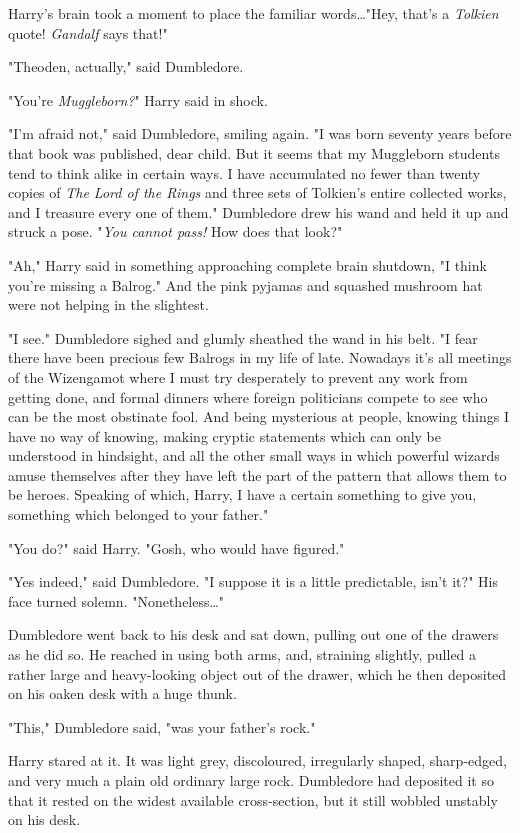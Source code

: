 Harry’s brain took a moment to place the familiar words…"Hey, that’s a
\emph{Tolkien} quote! \emph{Gandalf} says that!"

"Theoden, actually," said Dumbledore.

"You’re \emph{Muggleborn?}" Harry said in shock.

"I’m afraid not," said Dumbledore, smiling again. "I was born seventy years
before that book was published, dear child. But it seems that my Muggleborn
students tend to think alike in certain ways. I have accumulated no fewer than
twenty copies of \emph{The Lord of the Rings} and three sets of Tolkien’s
entire collected works, and I treasure every one of them." Dumbledore drew his
wand and held it up and struck a pose. "\emph{You cannot pass!} How does that
look?"

"Ah," Harry said in something approaching complete brain shutdown, "I think
you’re missing a Balrog." And the pink pyjamas and squashed mushroom hat were
not helping in the slightest.

"I see." Dumbledore sighed and glumly sheathed the wand in his belt. "I fear
there have been precious few Balrogs in my life of late. Nowadays it’s all
meetings of the Wizengamot where I must try desperately to prevent any work
from getting done, and formal dinners where foreign politicians compete to see
who can be the most obstinate fool. And being mysterious at people, knowing
things I have no way of knowing, making cryptic statements which can only be
understood in hindsight, and all the other small ways in which powerful wizards
amuse themselves after they have left the part of the pattern that allows them
to be heroes. Speaking of which, Harry, I have a certain something to give you,
something which belonged to your father."

"You do?" said Harry. "Gosh, who would have figured."

"Yes indeed," said Dumbledore. "I suppose it is a little predictable, isn’t
it?" His face turned solemn. "Nonetheless…"

Dumbledore went back to his desk and sat down, pulling out one of the drawers
as he did so. He reached in using both arms, and, straining slightly, pulled a
rather large and heavy-looking object out of the drawer, which he then
deposited on his oaken desk with a huge thunk.

"This," Dumbledore said, "was your father’s rock."

Harry stared at it. It was light grey, discoloured, irregularly shaped,
sharp-edged, and very much a plain old ordinary large rock. Dumbledore had
deposited it so that it rested on the widest available cross-section, but it
still wobbled unstably on his desk.

